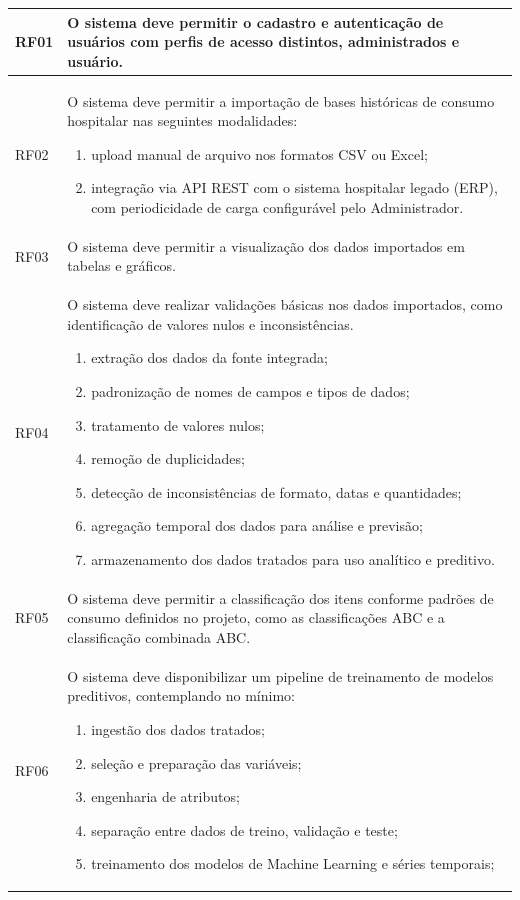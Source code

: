 \documentclass[12pt,a4paper]{article}
\providecommand{\rf}[2]{#1 & #2 \\\midrule}
\begin{document}
\begin{longtable}{p{} p{}}
    \rf{RF01}{O sistema deve permitir o cadastro e autenticação de usuários com perfis de acesso distintos, administrados e usuário.}
    \rf{RF02}{O sistema deve permitir a importação de bases históricas de
        consumo hospitalar nas seguintes modalidades:
        \begin{enumerate}[label=\alph*)]
            \item upload manual de arquivo nos formatos CSV ou Excel;
            \item integração via API REST com o sistema hospitalar legado (ERP),
                  com periodicidade de carga configurável pelo Administrador.
        \end{enumerate}
    }
    \rf{RF03}{O sistema deve permitir a visualização dos dados importados em tabelas e gráficos.}
    \rf{RF04}{O sistema deve realizar validações básicas nos dados importados, como identificação de valores nulos e inconsistências.
        \begin{enumerate}[label=\alph*)]
            \item extração dos dados da fonte integrada;
            \item padronização de nomes de campos e tipos de dados;
            \item tratamento de valores nulos;
            \item remoção de duplicidades;
            \item detecção de inconsistências de formato, datas e quantidades;
            \item agregação temporal dos dados para análise e previsão;
            \item armazenamento dos dados tratados para uso analítico e preditivo.
        \end{enumerate}
    }
    \rf{RF05}{O sistema deve permitir a classificação dos itens conforme padrões de consumo definidos no projeto, como as classificações ABC e a classificação combinada ABC.}
    \rf{RF06}{O sistema deve disponibilizar um pipeline de treinamento de modelos preditivos, contemplando no mínimo:
        \begin{enumerate}[label=\alph*)]
            \item ingestão dos dados tratados;
            \item seleção e preparação das variáveis;
            \item engenharia de atributos;
            \item separação entre dados de treino, validação e teste;
            \item treinamento dos modelos de Machine Learning e séries temporais;

\end{enumerate}}
\end{longtable}
\end{document}

